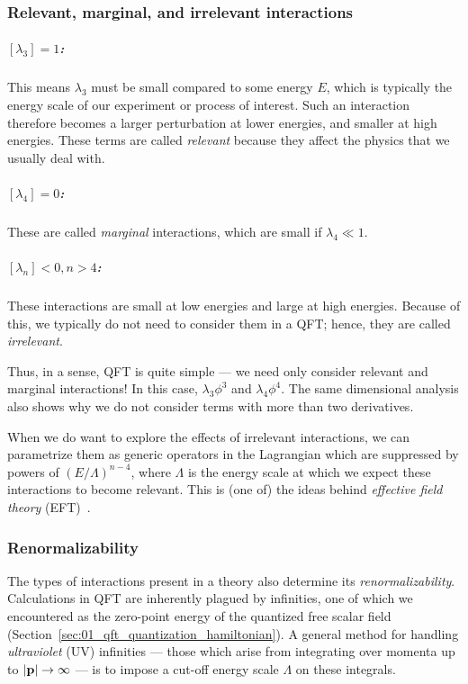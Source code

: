 \subsubsection{Relevant, marginal, and irrelevant interactions}

\subparagraph{$[\lambda_3] = 1$:} This means $\lambda_3$ must be small compared to some energy $E$, which is typically the energy scale of our experiment or process of interest.
Such an interaction therefore becomes a larger perturbation at lower energies, and smaller at high energies.
These terms are called \textit{relevant} because they affect the physics that we usually deal with.

\subparagraph{$[\lambda_4] = 0$:} These are called \textit{marginal} interactions, which are small if $\lambda_4 \ll 1$.

\subparagraph{$[\lambda_n] < 0, n > 4$:} These interactions are small at low energies and large at high energies.
Because of this, we typically do not need to consider them in a QFT; hence, they are called \textit{irrelevant}.

Thus, in a sense, QFT is quite simple --- we need only consider relevant and marginal interactions! In this case, $\lambda_3 \phi^3$ and $\lambda_4 \phi^4$.
The same dimensional analysis also shows why we do not consider terms with more than two derivatives.

When we do want to explore the effects of irrelevant interactions, we can parametrize them as generic operators in the Lagrangian which are suppressed by powers of $(E/\Lambda)^{n-4}$, where $\Lambda$ is the energy scale at which we expect these interactions to become relevant.
This is (one of) the ideas behind \textit{effective field theory} (EFT)~\cite{Manohar:2018aog, Isidori:2023pyp}.

\subsubsection{Renormalizability}

The types of interactions present in a theory also determine its \textit{renormalizability}.
Calculations in QFT are inherently plagued by infinities, one of which we encountered as the zero-point energy of the quantized free scalar field (Section~\ref{sec:01_qft_quantization_hamiltonian}).
A general method for handling \textit{ultraviolet} (UV) infinities --- those which arise from integrating over momenta up to $\left\lvert \mathbf{p} \right\rvert \rightarrow \infty$ --- is to impose a cut-off energy scale $\Lambda$ on these integrals.

